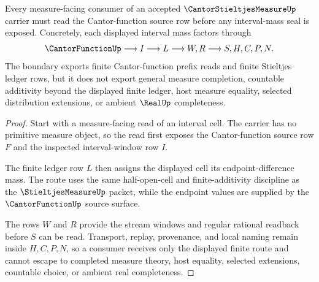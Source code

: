 \begin{theorem}
\label{thm:cantor-stieltjes-measure-function-boundary}
Every measure-facing consumer of an accepted $\CantorStieltjesMeasureUp$ carrier must read the Cantor-function source row before any interval-mass seal is exposed. Concretely, each displayed interval mass factors through
$$
\CantorFunctionUp \longrightarrow I \longrightarrow L \longrightarrow W,R \longrightarrow S,H,C,P,N .
$$
The boundary exports finite Cantor-function prefix reads and finite Stieltjes ledger rows, but it does not export general measure completion, countable additivity beyond the displayed finite ledger, host measure equality, selected distribution extensions, or ambient $\RealUp$ completeness.
\end{theorem}
\begin{proof}
Start with a measure-facing read of an interval cell. The carrier has no primitive measure object, so the read first exposes the Cantor-function source row $F$ and the inspected interval-window row $I$.

The finite ledger row $L$ then assigns the displayed cell its endpoint-difference mass. The route uses the same half-open-cell and finite-additivity discipline as the $\StieltjesMeasureUp$ packet, while the endpoint values are supplied by the $\CantorFunctionUp$ source surface.

The rows $W$ and $R$ provide the stream windows and regular rational readback before $S$ can be read. Transport, replay, provenance, and local naming remain inside $H,C,P,N$, so a consumer receives only the displayed finite route and cannot escape to completed measure theory, host equality, selected extensions, countable choice, or ambient real completeness.
\end{proof}


